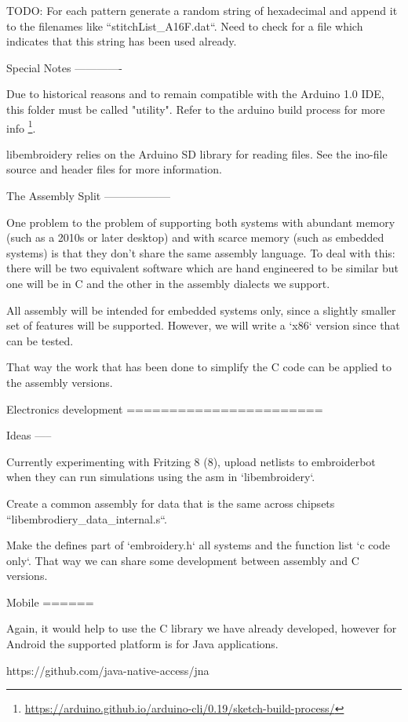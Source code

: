 \documentclass[a4paper]{report}
\begin{document}
TODO: For each pattern generate a random string of hexadecimal and append it
to the filenames like ``stitchList\_A16F.dat``. Need to check for a file
which indicates that this string has been used already.

Special Notes
-------------

Due to historical reasons and to remain compatible with the Arduino 1.0
IDE, this folder must be called "utility". Refer to the arduino build
process for more info
\footnote{\url{https://arduino.github.io/arduino-cli/0.19/sketch-build-process/}}.

libembroidery relies on the Arduino SD library for reading files. See
the ino-file source and header files for more information.

The Assembly Split
------------------

One problem to the problem of supporting both systems with abundant memory
(such as a 2010s or later desktop) and with scarce memory (such as embedded
systems) is that they don't share the same assembly language. To deal with
this: there will be two equivalent software which are hand engineered to be
similar but one will be in C and the other in the assembly dialects we support.

All assembly will be intended for embedded systems only, since a slightly
smaller set of features will be supported. However, we will write a
`x86` version since that can be tested.

That way the work that has been done to simplify the C code can be applied
to the assembly versions.

Electronics development
=======================

Ideas
-----

Currently experimenting with Fritzing 8 (8), upload netlists to embroiderbot when
they can run simulations using the asm in `libembroidery`.

Create a common assembly for data that is the same across chipsets
``libembrodiery\_data\_internal.s``.

Make the defines part of `embroidery.h` all systems and the function list
`c code only`. That way we can share some development between assembly and C versions.

Mobile
======

Again, it would help to use the C library we have already developed,
however for Android the supported platform is for Java applications.

https://github.com/java-native-access/jna
\end{document}
